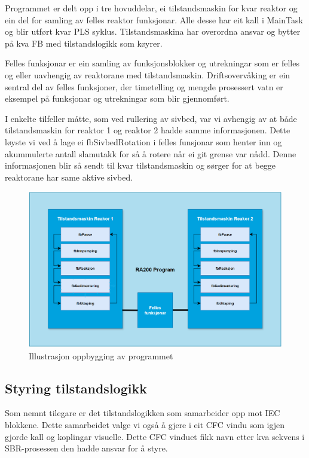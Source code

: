 Programmet er delt opp i tre hovuddelar, ei tilstandsmaskin for kvar reaktor og ein del for samling av felles reaktor funksjonar.
Alle desse har eit kall i MainTask og blir utført kvar PLS syklus. Tilstandsmaskina har overordna ansvar og bytter på kva 
\gls{FB} med tilstandslogikk som køyrer.

Felles funksjonar er ein samling av funksjonsblokker og utrekningar som er felles og eller uavhengig av reaktorane med tilstandsmaskin.
Driftsovervåking er ein sentral del av felles funksjoner, der timetelling og mengde prosessert vatn er eksempel på funksjonar og utrekningar
som blir gjennomført.

I enkelte tilfeller måtte, som ved rullering av sivbed, var vi avhengig av at både tilstandsmaskin for reaktor 1 og reaktor 2 hadde samme informasjonen.
Dette løyste vi ved å lage ei fbSivbedRotation i felles funsjonar som henter inn og akummulerte antall slamutakk for så å rotere når ei git grense var nådd.
Denne informasjonen blir så sendt til kvar tilstandsmaskin og sørger for at begge reaktorane har same aktive sivbed.


\begin{figure}[htbp]
    \centering
    \includegraphics[width=1\textwidth]{Figurar/Oppbygging_Program.png}
    \caption{Illustrasjon oppbygging av programmet}\label{fig:reaktorsoner}
\end{figure}


\newpage

\subsection{Styring tilstandslogikk}

Som nemnt tilegare er det tilstandslogikken som samarbeider opp mot IEC blokkene. Dette samarbeidet valge vi også å gjere i eit
CFC vindu som igjen gjorde kall og koplingar visuelle. Dette CFC vinduet fikk navn etter kva sekvens i SBR-prosessen
den hadde ansvar for å styre. 

